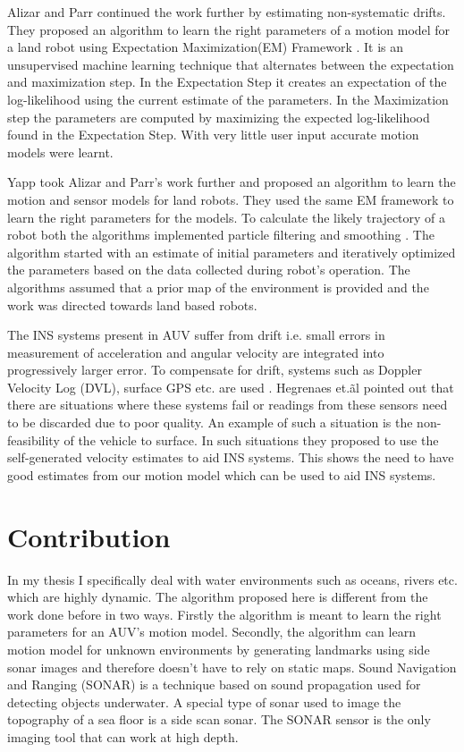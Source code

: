 \documentclass[12pt]{dalcsthesis}
\begin{document}
Alizar and Parr \cite{Eliazar2004} continued the work further by estimating non-systematic drifts.  They proposed an algorithm to learn the right parameters of a motion model for a land robot using Expectation Maximization(EM) Framework \cite{dempster1977maximum}. It is an unsupervised machine learning technique that alternates between the expectation and maximization step. In the Expectation Step it creates an expectation of the log-likelihood using the current estimate of the parameters. In the Maximization step the parameters are computed by maximizing the expected log-likelihood found in the Expectation Step. With very little user input accurate motion models were learnt.

Yapp \cite{Yap2008} took Alizar and Parr's \cite{Eliazar2004} work further and proposed an algorithm to learn the motion and sensor models for land robots. They used the same EM framework to learn the right parameters for the models. To calculate the likely trajectory of a robot both the algorithms implemented particle filtering \cite{ristic2004beyond} \cite{chen2003bayesian} and smoothing \cite{doucet2000monte}.  The algorithm started with an estimate of initial parameters and iteratively optimized the parameters based on the data collected during robot's operation. The algorithms assumed that a prior map of the environment is provided and the work was directed towards land based robots.

The INS systems present in AUV suffer from drift i.e. small errors in measurement of acceleration and angular velocity are integrated into progressively larger error. To compensate for drift, systems such as Doppler Velocity Log (DVL), surface GPS etc. are used \cite{Lammas2004} \cite{leonard1998autonomous}. Hegrenaes et.\~al \cite{Hegrenæs2008} pointed out that there are situations where these systems fail or readings from these sensors need to be discarded due to poor quality.  An example of such a situation is the non-feasibility of the vehicle to surface.  In such situations they proposed to use the self-generated velocity estimates to aid INS systems. This shows the need to have good estimates from our motion model which can be used to aid INS systems.

\section{Contribution}

In my thesis I specifically deal with water environments such as oceans, rivers etc. which are highly dynamic.  The algorithm proposed here is different from the work done before in two ways. Firstly the algorithm is meant to learn the right parameters for an AUV's motion model. Secondly, the algorithm can learn motion model for unknown environments by generating landmarks using side sonar images and therefore doesn't have to rely on static maps. Sound Navigation and Ranging (SONAR) is a technique based on sound propagation used for detecting objects underwater. A special type of  sonar used to image the topography of a sea floor is a side scan sonar. The SONAR sensor is the only imaging tool that can work at high depth. 
\end{document}
